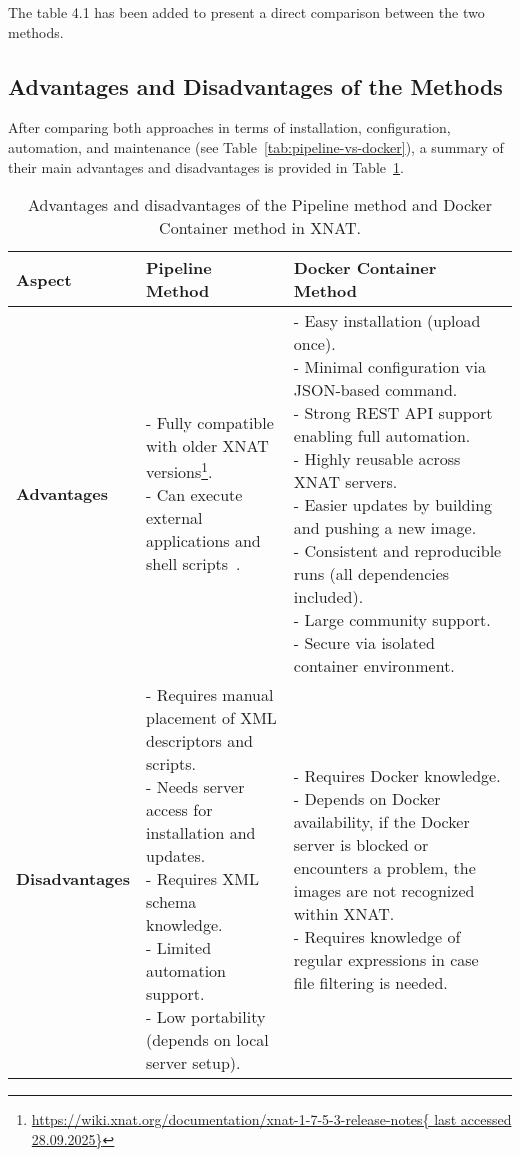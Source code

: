  The table 4.1 has been added to present a direct comparison between the two methods.







 
 \subsection{Advantages and Disadvantages of the Methods}

After comparing both approaches in terms of installation, configuration, automation, and maintenance (see Table~\ref{tab:pipeline-vs-docker}), a summary of their main advantages and disadvantages is provided in Table~\ref{tab:docker_pipeline}.

\begin{table}[htbp]
\centering
\renewcommand{\arraystretch}{1.3}
\begin{tabular}{|p{3cm}|p{6cm}|p{6cm}|}
\hline
\textbf{Aspect} & \textbf{Pipeline Method} & \textbf{Docker Container Method} \\
\hline
\textbf{Advantages} &
\parbox[t]{6cm}{
- Fully compatible with older XNAT versions\footnote{\url{https://wiki.xnat.org/documentation/xnat-1-7-5-3-release-notes{ last accessed 28.09.2025}}}.\\
- Can execute external applications and shell scripts~\cite{jansen_extending_2015}.
}
&
\parbox[t]{6cm}{
- Easy installation (upload once). \\
- Minimal configuration via JSON-based command. \\
- Strong REST API support enabling full automation. \\
- Highly reusable across XNAT servers. \\
- Easier updates by building and pushing a new image. \\
- Consistent and reproducible runs (all dependencies included). \\
- Large community support. \\
- Secure via isolated container environment. \\
} \\
\hline
\textbf{Disadvantages} &
\parbox[t]{6cm}{
- Requires manual placement of XML descriptors and scripts. \\
- Needs server access for installation and updates. \\
- Requires XML schema knowledge. \\
- Limited automation support. \\
- Low portability (depends on local server setup).\\
}
&
\parbox[t]{6cm}{
- Requires Docker knowledge. \\
- Depends on Docker availability, if the Docker server is blocked or encounters a problem, the images are not recognized within XNAT. \\
- Requires knowledge of regular expressions in case file filtering is needed.
} \\
\hline
\end{tabular}
\caption{Advantages and disadvantages of the Pipeline method and Docker Container method in XNAT.}
\label{tab:docker_pipeline}
\end{table}
